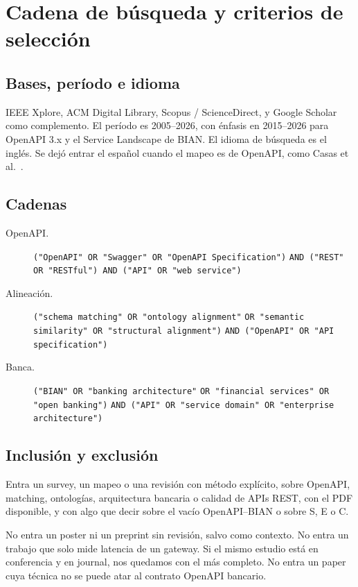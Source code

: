 \chapter{Cadena de búsqueda y criterios de selección}
\label{anexo:busqueda}

\section{Bases, período e idioma}

IEEE Xplore, ACM Digital Library, Scopus / ScienceDirect, y Google Scholar como complemento. El período es 2005--2026, con énfasis en 2015--2026 para OpenAPI 3.x y el Service Landscape de BIAN. El idioma de búsqueda es el inglés. Se dejó entrar el español cuando el mapeo es de OpenAPI, como Casas et al.\ \cite{Casas2021}.

\section{Cadenas}

\begin{description}
  \item[OpenAPI.] {\small\raggedright \texttt{("OpenAPI" OR "Swagger" OR "OpenAPI Specification")} \texttt{AND ("REST" OR "RESTful") AND ("API" OR "web service")}\par}
  \item[Alineación.] {\small\raggedright \texttt{("schema matching" OR "ontology alignment"} \texttt{OR "semantic similarity" OR "structural alignment")} \texttt{AND ("OpenAPI" OR "API specification")}\par}
  \item[Banca.] {\small\raggedright \texttt{("BIAN" OR "banking architecture"} \texttt{OR "financial services" OR "open banking")} \texttt{AND ("API" OR "service domain" OR "enterprise architecture")}\par}
\end{description}

\section{Inclusión y exclusión}

Entra un survey, un mapeo o una revisión con método explícito, sobre OpenAPI, matching, ontologías, arquitectura bancaria o calidad de APIs REST, con el PDF disponible, y con algo que decir sobre el vacío OpenAPI--BIAN o sobre S, E o C.

No entra un poster ni un preprint sin revisión, salvo como contexto. No entra un trabajo que solo mide latencia de un gateway. Si el mismo estudio está en conferencia y en journal, nos quedamos con el más completo. No entra un paper cuya técnica no se puede atar al contrato OpenAPI bancario.

